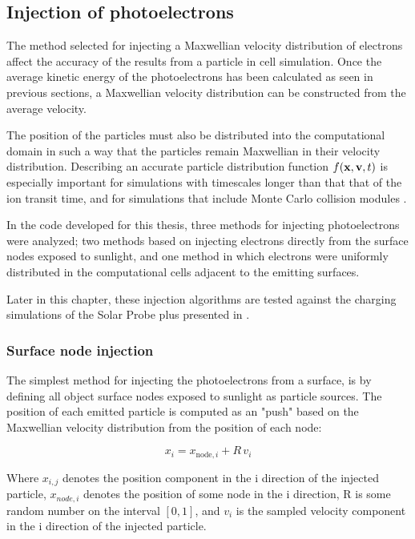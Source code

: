 \subsection{Injection of photoelectrons}
The method selected for injecting a Maxwellian velocity distribution of electrons affect the accuracy of the results from a particle in cell simulation. Once the average kinetic energy of the photoelectrons has been calculated as seen in previous sections, a Maxwellian velocity distribution can be constructed from the average velocity. 

The position of the particles must also be distributed into the computational domain in such a way that the particles remain Maxwellian in their velocity distribution. Describing an accurate particle distribution function $f(\vb{x}, \vb{v}, t)$ is especially important for simulations with timescales longer than that that of the ion transit time, and for simulations that include Monte Carlo collision modules .  

In the code developed for this thesis, three methods for injecting photoelectrons were analyzed; two methods based on injecting electrons directly from the surface nodes exposed to sunlight, and one method in which electrons were uniformly distributed in the computational cells adjacent to the emitting surfaces.

Later in this chapter, these injection algorithms are tested against the charging simulations of the Solar Probe plus presented in .

\subsubsection*{Surface node injection}

The simplest method for injecting the photoelectrons from a surface, is by defining all object surface nodes exposed to sunlight as particle sources. The position of each emitted particle is computed as an "push" based on the Maxwellian velocity distribution from the position of each node:

\begin{equation}\label{eq:injection}
    x_i = x_{\text{node},i} + R \, v_i
\end{equation}

Where $x_{i,j}$ denotes the position component in the i direction of the injected particle, $x_{node,i}$ denotes the position of some node in the i direction, R is some random number on the interval $[0,1]$, and $v_i$ is the sampled velocity component in the i direction of the injected particle.

